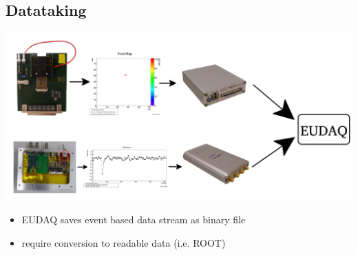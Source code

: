 \documentclass[9pt]{beamer}
\begin{document}
\subsection{Datataking}
\begin{frame}
	\begin{center}
		\includegraphics[width=\textwidth]{Intro}
	\end{center}
	\begin{itemize}
		\item EUDAQ saves event based data stream as binary file
		\item require conversion to readable data (i.e. ROOT)
	\end{itemize}
\end{frame}
\end{document}
